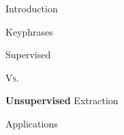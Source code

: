   \begin{frame}{Introduction}
    \begin{block}{Keyphrases}
    \end{block}
    \begin{center}\begin{Large}Supervised \begin{small}\textsc{Vs.}\end{small} \textbf{Unsupervised} Extraction\end{Large}\end{center}
    \begin{block}{Applications}
    \end{block}
  \end{frame}

